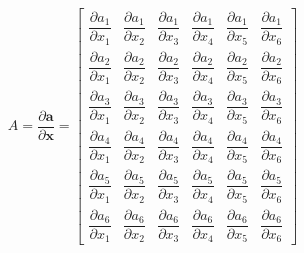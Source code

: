 \begin{equation}
	A = \dfrac{\partial \boldsymbol a}{\partial \boldsymbol x} =
	\begin{bmatrix}
		\dfrac{\partial  a_1}{\partial  x_1}&
		\dfrac{\partial  a_1}{\partial  x_2}&
		\dfrac{\partial  a_1}{\partial  x_3}&
		\dfrac{\partial  a_1}{\partial  x_4}&
		\dfrac{\partial  a_1}{\partial  x_5}&
		\dfrac{\partial  a_1}{\partial  x_6}
		\\[1em]
		\dfrac{\partial  a_2}{\partial  x_1}&
		\dfrac{\partial  a_2}{\partial  x_2}&
		\dfrac{\partial  a_2}{\partial  x_3}&
		\dfrac{\partial  a_2}{\partial  x_4}&
		\dfrac{\partial  a_2}{\partial  x_5}&
		\dfrac{\partial  a_2}{\partial  x_6}
		\\[1em]
		\dfrac{\partial  a_3}{\partial  x_1}&
		\dfrac{\partial  a_3}{\partial  x_2}&
		\dfrac{\partial  a_3}{\partial  x_3}&
		\dfrac{\partial  a_3}{\partial  x_4}&
		\dfrac{\partial  a_3}{\partial  x_5}&
		\dfrac{\partial  a_3}{\partial  x_6}
		\\[1em]
		\dfrac{\partial  a_4}{\partial  x_1}&
		\dfrac{\partial  a_4}{\partial  x_2}&
		\dfrac{\partial  a_4}{\partial  x_3}&
		\dfrac{\partial  a_4}{\partial  x_4}&
		\dfrac{\partial  a_4}{\partial  x_5}&
		\dfrac{\partial  a_4}{\partial  x_6}
		\\[1em]
		\dfrac{\partial  a_5}{\partial  x_1}&
		\dfrac{\partial  a_5}{\partial  x_2}&
		\dfrac{\partial  a_5}{\partial  x_3}&
		\dfrac{\partial  a_5}{\partial  x_4}&
		\dfrac{\partial  a_5}{\partial  x_5}&
		\dfrac{\partial  a_5}{\partial  x_6}
		\\[1em]
		\dfrac{\partial  a_6}{\partial  x_1}&
		\dfrac{\partial  a_6}{\partial  x_2}&
		\dfrac{\partial  a_6}{\partial  x_3}&
		\dfrac{\partial  a_6}{\partial  x_4}&
		\dfrac{\partial  a_6}{\partial  x_5}&
		\dfrac{\partial  a_6}{\partial  x_6}
	\end{bmatrix}
\end{equation}

